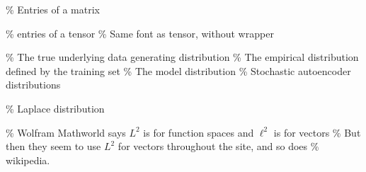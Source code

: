 \documentclass[
  letterpaper,
  DIV=11,
  numbers=noendperiod]{scrartcl}
\begin{document}
\% Entries of a matrix \def\emLambda{{\Lambda}} \def\emA{{A}}
\def\emB{{B}} \def\emC{{C}} \def\emD{{D}} \def\emE{{E}} \def\emF{{F}}
\def\emG{{G}} \def\emH{{H}} \def\emI{{I}} \def\emJ{{J}} \def\emK{{K}}
\def\emL{{L}} \def\emM{{M}} \def\emN{{N}} \def\emO{{O}} \def\emP{{P}}
\def\emQ{{Q}} \def\emR{{R}} \def\emS{{S}} \def\emT{{T}} \def\emU{{U}}
\def\emV{{V}} \def\emW{{W}} \def\emX{{X}} \def\emY{{Y}} \def\emZ{{Z}}
\def\emSigma{{\Sigma}}

\% entries of a tensor \% Same font as tensor, without \bm wrapper

\newcommand{\etens}[1]{\mathsfit{#1}}
\def\etLambda{{\etens{\Lambda}}}
\def\etA{{\etens{A}}}
\def\etB{{\etens{B}}}
\def\etC{{\etens{C}}}
\def\etD{{\etens{D}}}
\def\etE{{\etens{E}}}
\def\etF{{\etens{F}}}
\def\etG{{\etens{G}}}
\def\etH{{\etens{H}}}
\def\etI{{\etens{I}}}
\def\etJ{{\etens{J}}}
\def\etK{{\etens{K}}}
\def\etL{{\etens{L}}}
\def\etM{{\etens{M}}}
\def\etN{{\etens{N}}}
\def\etO{{\etens{O}}}
\def\etP{{\etens{P}}}
\def\etQ{{\etens{Q}}}
\def\etR{{\etens{R}}}
\def\etS{{\etens{S}}}
\def\etT{{\etens{T}}}
\def\etU{{\etens{U}}}
\def\etV{{\etens{V}}}
\def\etW{{\etens{W}}}
\def\etX{{\etens{X}}}
\def\etY{{\etens{Y}}}
\def\etZ{{\etens{Z}}}

\% The true underlying data generating distribution
\newcommand{\pdata}{p_{\rm{data}}} \% The empirical distribution defined
by the training set \newcommand{\ptrain}{\hat{p}_{\rm{data}}}
\newcommand{\Ptrain}{\hat{P}_{\rm{data}}} \% The model distribution
\newcommand{\pmodel}{p_{\rm{model}}}
\newcommand{\Pmodel}{P_{\rm{model}}}
\newcommand{\ptildemodel}{\tilde{p}_{\rm{model}}} \% Stochastic
autoencoder distributions \newcommand{\pencode}{p_{\rm{encoder}}}
\newcommand{\pdecode}{p_{\rm{decoder}}}
\newcommand{\precons}{p_{\rm{reconstruct}}}

\newcommand{\laplace}{\mathrm{Laplace}}

\% Laplace distribution

\newcommand{\E}{\mathbb{E}}
\newcommand{\Ls}{\mathcal{L}}
\newcommand{\R}{\mathbb{R}}
\newcommand{\emp}{\tilde{p}}
\newcommand{\lr}{\alpha}
\newcommand{\reg}{\lambda}
\newcommand{\rect}{\mathrm{rectifier}}
\newcommand{\softmax}{\mathrm{softmax}}
\newcommand{\sigmoid}{\sigma}
\newcommand{\softplus}{\zeta}
\newcommand{\KL}{D_{\mathrm{KL}}}
\newcommand{\Var}{\mathrm{Var}}
\newcommand{\standarderror}{\mathrm{SE}}
\newcommand{\Cov}{\mathrm{Cov}}

\% Wolfram Mathworld says \(L^2\) is for function spaces and \(\ell^2\)
is for vectors \% But then they seem to use \(L^2\) for vectors
throughout the site, and so does \% wikipedia.
\newcommand{\normlzero}{L^0} \newcommand{\normlone}{L^1}
\newcommand{\normltwo}{L^2} \newcommand{\normlp}{L^p}
\newcommand{\normmax}{L^\infty}
\end{document}
